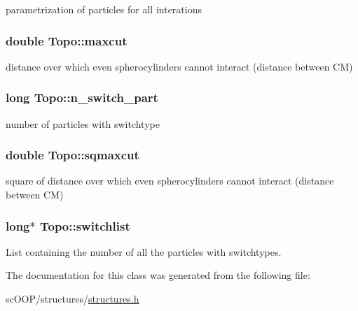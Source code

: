 parametrization of particles for all interations 

\hypertarget{class_topo_a5058af2ecbcdeb4282e1626198e28c42}{
\subsubsection[{maxcut}]{\setlength{\rightskip}{0pt plus 5cm}double Topo\+::maxcut}}\label{class_topo_a5058af2ecbcdeb4282e1626198e28c42}


distance over which even spherocylinders cannot interact (distance between C\+M) 

\hypertarget{class_topo_a2df8a376cf0d57fba8b5a2513aafcd40}{
\subsubsection[{n\+\_\+switch\+\_\+part}]{\setlength{\rightskip}{0pt plus 5cm}long Topo\+::n\+\_\+switch\+\_\+part}}\label{class_topo_a2df8a376cf0d57fba8b5a2513aafcd40}


number of particles with switchtype 

\hypertarget{class_topo_a1f0ab42bb23e360ab07bb5439689b5f1}{
\subsubsection[{sqmaxcut}]{\setlength{\rightskip}{0pt plus 5cm}double Topo\+::sqmaxcut}}\label{class_topo_a1f0ab42bb23e360ab07bb5439689b5f1}


square of distance over which even spherocylinders cannot interact (distance between C\+M) 

\hypertarget{class_topo_a0ecb4fc994f31c3d02d78b150df71057}{
\subsubsection[{switchlist}]{\setlength{\rightskip}{0pt plus 5cm}long$\ast$ Topo\+::switchlist}}\label{class_topo_a0ecb4fc994f31c3d02d78b150df71057}


List containing the number of all the particles with switchtypes. 



The documentation for this class was generated from the following file\+:\begin{DoxyCompactItemize}
\item 
sc\+O\+O\+P/structures/\hyperlink{structures_8h}{structures.\+h}\end{DoxyCompactItemize}
